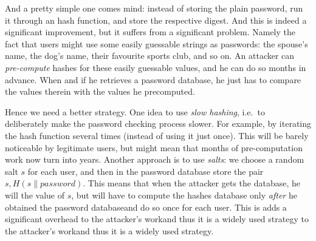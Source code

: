   And a pretty simple one comes mind: instead of storing the plain password, run it through an hash function, and store the respective digest. And this is indeed a significant improvement, but it suffers from a significant problem. Namely the fact that users might use some easily guessable strings as passwords: the spouse's name, the dog's name, their favourite sports club, and so on. An attacker can \emph{pre-compute} hashes for these easily guessable values, and he can do so months in advance. When and if he retrieves a password database, he just has to compare the values therein with the values he precomputed.

  Hence we need a better strategy. One idea to use \emph{slow hashing}, i.e.\ to deliberately make the password checking process slower. For example, by iterating the hash function several times (instead of using it just once). This will be barely noticeable by legitimate users, but might mean that months of pre-computation work now turn into years. Another approach is to use \emph{salts}: we choose a random salt $s$ for each user, and then in the password database store the pair $s, H(s\|password)$. This means that when the attacker gets the database, he will the value of $s$, but will have to compute the hashes database only \emph{after} he obtained the password database\emd and do so once for each user. This is adds a  significant overhead to the attacker's work\emd and thus it is a widely used strategy to the attacker's work\emd and thus it is a widely used strategy.


